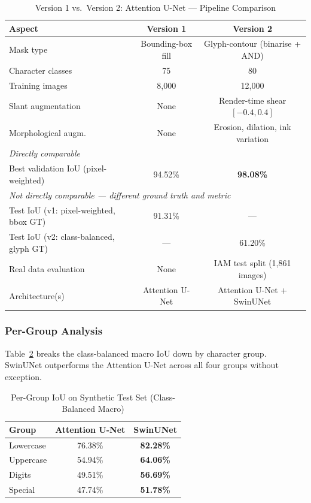 \documentclass[a4paper,11pt]{article}
\begin{document}
\begin{table}[H]
\centering
\caption{Version 1 vs.\ Version 2: Attention U-Net --- Pipeline Comparison}
\label{tab:v1v2}
\begin{tabular}{lcc}
\toprule
\textbf{Aspect} & \textbf{Version 1} & \textbf{Version 2} \\
\midrule
Mask type              & Bounding-box fill       & Glyph-contour (binarise + AND) \\
Character classes      & 75                      & 80 \\
Training images        & 8,000                   & 12,000 \\
Slant augmentation     & None                    & Render-time shear $[-0.4, 0.4]$ \\
Morphological augm.    & None                    & Erosion, dilation, ink variation \\
\midrule
\multicolumn{3}{l}{\textit{Directly comparable}} \\
\addlinespace[2pt]
Best validation IoU (pixel-weighted) & 94.52\% & \textbf{98.08\%} \\
\midrule
\multicolumn{3}{l}{\textit{Not directly comparable --- different ground truth and metric}} \\
\addlinespace[2pt]
Test IoU (v1: pixel-weighted, bbox GT) & 91.31\% & --- \\
Test IoU (v2: class-balanced, glyph GT) & --- & 61.20\% \\
\midrule
Real data evaluation   & None                    & IAM test split (1,861 images) \\
Architecture(s)        & Attention U-Net         & Attention U-Net + SwinUNet \\
\bottomrule
\end{tabular}
\end{table}

\subsubsection{Per-Group Analysis}

Table~\ref{tab:per_group} breaks the class-balanced macro IoU down by character group.
SwinUNet outperforms the Attention U-Net across all four groups without exception.

\begin{table}[H]
\centering
\caption{Per-Group IoU on Synthetic Test Set (Class-Balanced Macro)}
\label{tab:per_group}
\begin{tabular}{lcc}
\toprule
\textbf{Group} & \textbf{Attention U-Net} & \textbf{SwinUNet} \\
\midrule
Lowercase   & 76.38\% & \textbf{82.28\%} \\
Uppercase   & 54.94\% & \textbf{64.06\%} \\
Digits      & 49.51\% & \textbf{56.69\%} \\
Special     & 47.74\% & \textbf{51.78\%} \\
\bottomrule
\end{tabular}
\end{table}
\end{document}
